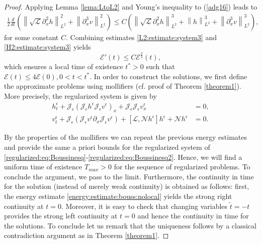 \documentclass[final,11pt,a4paper,reqno]{amsart}
\newcommand{\norm}[1]{\left\| #1 \right\|}
\newcommand{\pa}{\partial}
\theoremstyle{definition}
\begin{document}
\begin{proof}
Applying Lemma \ref{lema:LtoL2} and Young's inequality to (\ref{adg16}) leads to
\begin{align}\label{H2:estimate:system3}
\frac{1}{2}\frac{d}{dt}\left( \norm{\sqrt{\mathscr{L}}\pa_{x}^{2}h}_{L^{2}}^{2}+ \norm{\pa_{x}^{3}v}_{L^{2}}^{2} \right) \leq  C \left( \norm{\sqrt{\mathscr{L}}\pa_{x}^2 h}^{3}_{L^{2}}+\norm{h}^{3}_{L^{2}} +\norm{\pa_{x}^{3}v}^{3}_{L^{2}}\right),
\end{align}
for some constant $C$. 
Combining estimates \eqref{L2:estimate:system3} and \eqref{H2:estimate:system3} yields
\begin{equation}\label{energy:estimate:bouss:nolocal}
\mathcal{E}'(t)\leq C \mathcal{E}^{\frac{3}{2}}(t),
\end{equation}
which ensures a local time of existence $t^{*}>0$ such that $\mathcal{E}(t)\leq 4 \mathcal{E}(0), 0<t<t^{*}.$
In order to construct the solutions, we first define the approximate problems using mollifiers (cf. proof of Theorem \ref{theorem1}). More precisely, the regularized system is given by
\begin{subequations}
	\begin{align}
		h^{\epsilon}_t+\mathcal{J}_{\epsilon}(\mathcal{J}_{\epsilon}h^{\epsilon}\mathcal{J}_{\epsilon}v^{\epsilon})_x+\mathcal{J}_{\epsilon}\mathcal{J}_{\epsilon}v^{\epsilon}_x&=0, \label{regularized:eq:Boussinesq} \\
		v^{\epsilon}_t+\mathcal{J}_{\epsilon}(\mathcal{J}_{\epsilon}v^{\epsilon}\partial_{x}\mathcal{J}_{\epsilon}v^{\epsilon})+\left[\mathscr{L},\mathscr{N}h^{\epsilon}\right]h^{\epsilon}+\mathscr{N}h^{\epsilon}&=0.\label{regularized:eq:Boussinesq2}
	\end{align}
\end{subequations}


 By the properties of the mollifiers we can repeat the previous energy estimates and provide the same a priori bounds for the regularized system of \eqref{regularized:eq:Boussinesq}-\eqref{regularized:eq:Boussinesq2}. Hence, we will find a uniform time of existence $T_{max}>0$ for the sequence of regularized problems. To conclude the argument, we pass to the limit. Furthermore, the continuity in time for the solution (instead of merely weak continuity) is obtained as follows: first, the energy estimate \eqref{energy:estimate:bouss:nolocal} yields the strong right continuity at $t=0$. Moreover, it is easy to check that changing variables $\tilde{t}=-t$ provides the strong left continuity at $t=0$ and hence the continuity in time for the solutions. To conclude let us remark that the uniqueness follows by a classical contradiction argument as in Theorem \ref{theorem1}.
\end{proof}
\end{document}
